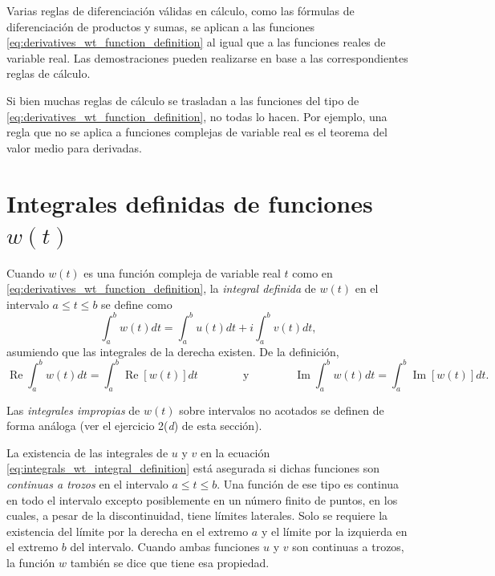 \documentclass[a4paper]{report}
\renewcommand{\Re}{\operatorname{Re}}
\renewcommand{\Im}{\operatorname{Im}}
\begin{document}
Varias reglas de diferenciación válidas en cálculo, como las fórmulas de diferenciación de productos y sumas, se aplican a las funciones \ref{eq:derivatives_wt_function_definition} al igual que a las funciones reales de variable real. Las demostraciones pueden realizarse en base a las correspondientes reglas de cálculo.

Si bien muchas reglas de cálculo se trasladan a las funciones del tipo de \ref{eq:derivatives_wt_function_definition}, no todas lo hacen. Por ejemplo, una regla que no se aplica a funciones complejas de variable real es el teorema del valor medio para derivadas.

\section{Integrales definidas de funciones \texorpdfstring{\(w(t)\)}{w(t)}}\label{sec:definite_integrals_wt}

Cuando \(w(t)\) es una función compleja de variable real \(t\) como en \ref{eq:derivatives_wt_function_definition}, la \emph{integral definida} de \(w(t)\) en el intervalo \(a\leq t\leq b\) se define como 
\begin{equation}\label{eq:integrals_wt_integral_definition}
 \int_a^b w(t)dt=\int_a^b u(t)dt+i\int_a^b v(t)dt,
\end{equation}
asumiendo que las integrales de la derecha existen. De la definición,
\begin{equation}\label{eq:integrals_wt_integral_real_imaginary_parts}
 \Re\int_a^b w(t)dt=\int_a^b \Re[w(t)]dt
 \qquad\qquad\textrm{y}\qquad\qquad
 \Im\int_a^b w(t)dt=\int_a^b \Im[w(t)]dt. 
\end{equation}

Las \emph{integrales impropias} de \(w(t)\) sobre intervalos no acotados se definen de forma análoga (ver el ejercicio 2(\textit{d}) de esta sección).

La existencia de las integrales de \(u\) y \(v\) en la ecuación \ref{eq:integrals_wt_integral_definition} está asegurada si dichas funciones son \emph{continuas a trozos} en el intervalo \(a\leq t\leq b\). Una función de ese tipo es continua en todo el intervalo excepto posiblemente en un número finito de puntos, en los cuales, a pesar de la discontinuidad, tiene límites laterales. 
Solo se requiere la existencia del límite por la derecha en el extremo \(a\) y el límite por la izquierda en el extremo \(b\) del intervalo. Cuando ambas funciones \(u\) y \(v\) son continuas a trozos, la función \(w\) también se dice que tiene esa propiedad.
\end{document}
